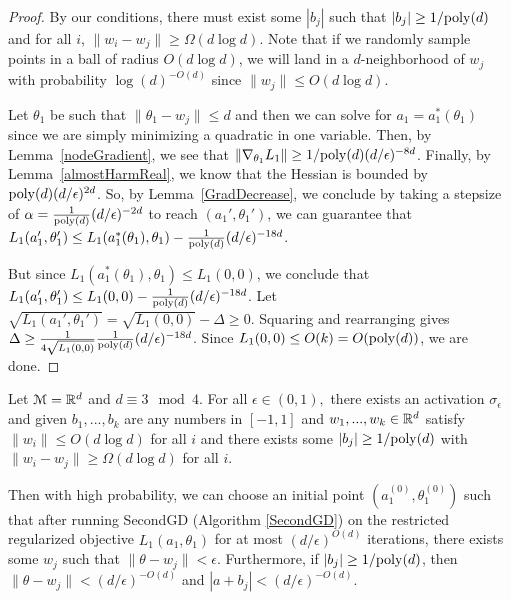 \begin{proof}
By our conditions, there must exist some $|b_j|$ such that $|b_j| \geq 1/\mathrm{poly}(d)$ and for all $i$, $\|w_i - w_j\| \geq \Omega(d\log d)$. Note that if we randomly sample points in a ball of radius $O(d\log d)$, we will land in a $d$-neighborhood of $w_j$ with probability $\log(d)^{-O(d)}$ since $\|w_j\|\leq O(d\log d)$. 

Let $\theta_1$ be such that $\|\theta_1 - w_j \| \leq d$ and then we can solve for $a_1 = a_1^*(\theta_1)$ since we are simply minimizing a quadratic in one variable. Then, by Lemma~\ref{nodeGradient}, we see that $\|\nabla_{\theta_1}L_1 \| \geq 1/\mathrm{poly}(d)(d/\epsilon)^{-8d}$. Finally, by Lemma~\ref{almostHarmReal}, we know that the Hessian is bounded by $\mathrm{poly}(d)(d/\epsilon)^{2d }$. So, by Lemma~\ref{GradDecrease}, we conclude by taking a stepsize of $\alpha = \frac{1}{\mathrm{poly}(d)}(d/\epsilon)^{-2d}$ to reach $(a_1',\theta_1')$, we can guarantee that $L_1(a_1', \theta_1') \leq L_1 (a_1^*(\theta_1), \theta_1) - \frac{1}{\mathrm{poly}(d)} (d/\epsilon)^{ -18d}$.

But since $L_1(a_1^*(\theta_1),\theta_1)\leq L_1(0,0)$, we conclude that $L_1(a_1', \theta_1') \leq L_1(0,0) -  \frac{1}{\mathrm{poly}(d)} (d/\epsilon)^{ -18d}$. Let $\sqrt{L_1(a_1', \theta_1')} = \sqrt{L_1(0,0)} - \Delta \geq 0$. Squaring and rearranging gives $\Delta \geq \frac{1}{4\sqrt{L_1( 0, 0)}}  \frac{1}{\mathrm{poly}(d)}(d/\epsilon)^{ -18d} $. Since $L_1(0,0) \leq O(k) = O(\mathrm{poly}(d))$, we are done. 

\end{proof}
%
\begin{lemma}\label{nodewiseSGD}
Let $\mathcal{M} = {\mathbb{R}}^{d}$ and $d\equiv 3 \mod 4$. For all $\epsilon \in (0,1),$ there exists an activation $\sigma_\epsilon$ and given $b_1,...,b_k$ are any numbers in $[-1,1]$ and $w_1,...,w_k \in {\mathbb{R}}^d$ satisfy $\|w_i\|\leq O(d\log d)$ for all $i$ and there exists some $|b_j| \geq 1/\mathrm{poly}(d)$ with $\|w_i - w_j\| \geq \Omega(d\log d)$ for all $i$.

Then with high probability, we can choose an initial point $(a_1^{(0)}, \theta_1^{(0)})$ such that after running SecondGD (Algorithm \ref{SecondGD}) on the restricted regularized objective $L_1(a_1,\theta_1)$ for at most $(d/\epsilon)^{O(d)}$ iterations, there exists some $w_j$ such that $\|\theta - w_j\| < \epsilon$. Furthermore, if $|b_j| \geq 1/\mathrm{poly}(d)$, then $\|\theta - w_j\| < (d/\epsilon)^{-O(d)}$ and $|a + b_j| < (d/\epsilon)^{-O(d)}$.
\end{lemma}


